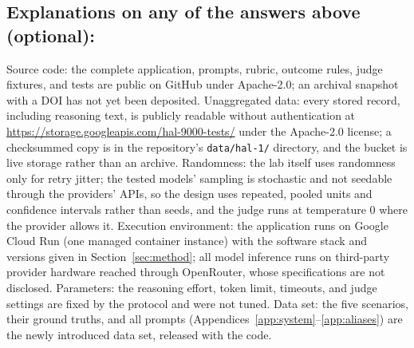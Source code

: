 \subsection*{Explanations on any of the answers above (optional):}

Source code: the complete application, prompts, rubric, outcome rules, judge fixtures, and tests are public on GitHub under Apache-2.0; an archival snapshot with a DOI has not yet been deposited. Unaggregated data: every stored record, including reasoning text, is publicly readable without authentication at \url{https://storage.googleapis.com/hal-9000-tests/} under the Apache-2.0 license; a checksummed copy is in the repository's \texttt{data/hal-1/} directory, and the bucket is live storage rather than an archive. Randomness: the lab itself uses randomness only for retry jitter; the tested models' sampling is stochastic and not seedable through the providers' APIs, so the design uses repeated, pooled units and confidence intervals rather than seeds, and the judge runs at temperature 0 where the provider allows it. Execution environment: the application runs on Google Cloud Run (one managed container instance) with the software stack and versions given in Section~\ref{sec:method}; all model inference runs on third-party provider hardware reached through OpenRouter, whose specifications are not disclosed. Parameters: the reasoning effort, token limit, timeouts, and judge settings are fixed by the protocol and were not tuned. Data set: the five scenarios, their ground truths, and all prompts (Appendices~\ref{app:system}--\ref{app:aliases}) are the newly introduced data set, released with the code.


